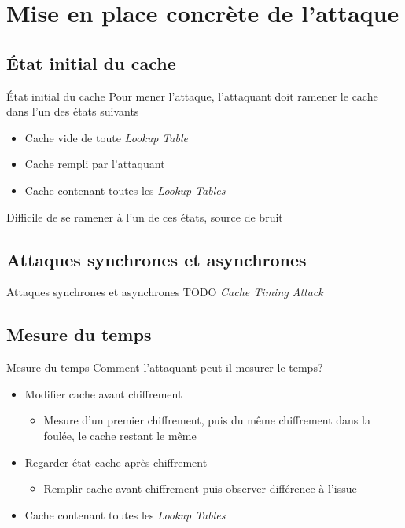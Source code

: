 \documentclass[11pt]{beamer}
\begin{document}
\section{Mise en place concrète de l'attaque}

\subsection{État initial du cache}
\begin{frame}{État initial du cache}
	Pour mener l'attaque, l'attaquant doit ramener le cache dans l'un des états suivants
	\begin{itemize}
		\item Cache vide de toute \emph{Lookup Table}
		\item Cache rempli par l'attaquant
		\item Cache contenant toutes les \emph{Lookup Tables}		
	\end{itemize}
	Difficile de se ramener à l'un de ces états, source de bruit
	
\end{frame}

\subsection{Attaques synchrones et asynchrones}
\begin{frame}{Attaques synchrones et asynchrones}
TODO \emph{Cache Timing Attack} 
\end{frame}

\subsection{Mesure du temps}
\begin{frame}{Mesure du temps}
	Comment l'attaquant peut-il mesurer le temps?	
	\begin{itemize}
		\item Modifier cache avant chiffrement
		\begin{itemize}
			\item Mesure d'un premier chiffrement, puis du même chiffrement dans la foulée, le cache restant le même
		\end{itemize}			
		\item Regarder état cache après chiffrement
		\begin{itemize}
			\item Remplir cache avant chiffrement puis observer différence à l'issue
		\end{itemize}	
		\item Cache contenant toutes les \emph{Lookup Tables}		
	\end{itemize}
\end{frame}
\end{document}
